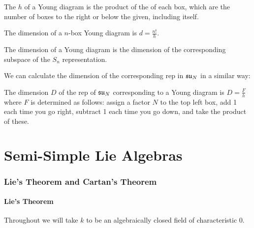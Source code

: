 \documentclass{article}
\begin{document}
\begin{definition}
	The  $h$ of a Young diagram is the product of the  of each box, which are the number of boxes to the right or below the given, including itself. 
\end{definition}

\begin{definition}
	The dimension of a $n$-box Young diagram is $d= \frac{n!}{h}$. 
\end{definition}

\begin{prop}
	The dimension of a Young diagram is the dimension of the corresponding subspace of the $S_n$ representation.
\end{prop}

We can calculate the dimension of the corresponding rep in $\mathfrak{su}_N$ in a similar way:

\begin{prop}
	The dimension $D$ of the rep of $\mathfrak{su}_N$ corresponding to a Young diagram is $D = \frac{F}{h}$ where $F$ is determined as follows: assign a factor $N$ to the top left box, add 1 each time you go right, subtract 1 each time you go down, and take the product of these. 
\end{prop} 

\part{Semi-Simple Lie Algebras}

\section{Lie's Theorem and Cartan's Theorem}
\subsection{Lie's Theorem}

\begin{notation}
	Throughout we will take $k$ to be an algebraically closed field of characteristic 0. 
\end{notation}
\end{document}
